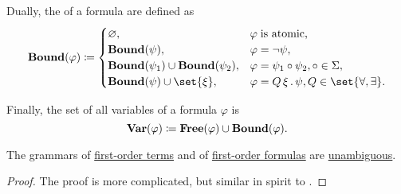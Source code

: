 \begin{definition}
\begin{thmenum}
     Dually, the  of a formula are defined as
    \begin{equation}\label{eq:def:first_order_syntax/formula_bound_variables}
      \boldop{Bound}(\varphi) \coloneqq \begin{cases}
        \varnothing,                                        &\varphi \T{is atomic,} \\
        \boldop{Bound}(\psi),                               &\varphi = \neg \psi, \\
        \boldop{Bound}(\psi_1) \cup \boldop{Bound}(\psi_2), &\varphi = \psi_1 \bincirc \psi_2, \bincirc \in \Sigma, \\
        \boldop{Bound}(\psi) \cup \set{ \xi },              &\varphi = \quantifier{Q}{\xi} \psi, Q \in \set{ \forall, \exists }.
      \end{cases}
    \end{equation}

     Finally, the set of all variables of a formula \( \varphi \) is
    \begin{equation}\label{eq:def:first_order_syntax/formula_variables}
      \operatorname{\mathbf{Var}}(\varphi) \coloneqq \operatorname{\mathbf{Free}}(\varphi) \cup \operatorname{\mathbf{Bound}}(\varphi).
    \end{equation}
  \end{thmenum}
\end{definition}

\begin{proposition}\label{thm:first_order_terms_and_formulas_are_unambiguous}
  The grammars of \hyperref[def:first_order_syntax/term]{first-order terms} and of \hyperref[def:first_order_syntax/formula]{first-order formulas} are \hyperref[def:grammar_ambiguity]{unambiguous}.
\end{proposition}
\begin{proof}
  The proof is more complicated, but similar in spirit to .
\end{proof}

